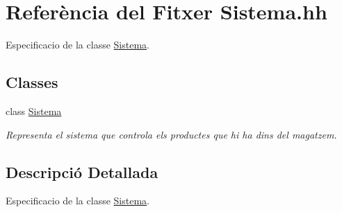 \hypertarget{_sistema_8hh}{}\section{Referència del Fitxer Sistema.\+hh}
\label{_sistema_8hh}


Especificacio de la classe \hyperlink{class_sistema}{Sistema}.  


\subsection*{Classes}
\begin{DoxyCompactItemize}
\item 
class \hyperlink{class_sistema}{Sistema}
\begin{DoxyCompactList}\small\item\em Representa el sistema que controla els productes que hi ha dins del magatzem. \end{DoxyCompactList}\end{DoxyCompactItemize}


\subsection{Descripció Detallada}
Especificacio de la classe \hyperlink{class_sistema}{Sistema}. 

